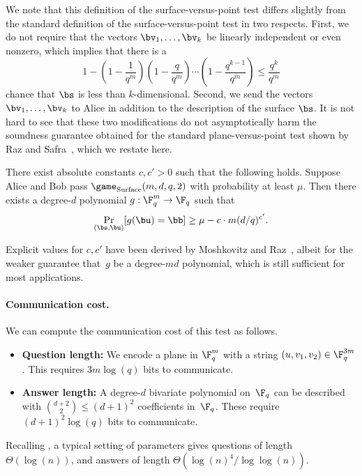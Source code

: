 We note that this definition of the surface-versus-point test differs slightly from the standard
definition of the surface-versus-point test in two respects. First, we
do not require that the vectors $\bv_1, \ldots, \bv_k$ be linearly independent
or even nonzero, which implies that there is a
\begin{equation*}
1-
\left(1 -\frac{1}{q^m}\right)
\left(1 -\frac{q}{q^m}\right)
\cdots
\left(1 -\frac{q^{k-1}}{q^m}\right)
\leq \frac{q^k}{q^m}
\end{equation*}
 chance that $\bs$
is less than $k$-dimensional. Second, we send the vectors $\bv_1,
\ldots, \bv_k$ to Alice in addition to the description of the surface $\bs$. It
is not hard to see that these two modifications do not asymptotically harm the
soundness guarantee obtained for the standard plane-versus-point test shown by Raz and
Safra~\cite{RS97}, which we restate here.

\begin{theorem}[\cite{RS97}]\label{thm:raz-safra}
There exist absolute constants $c, c' > 0$ such that the following holds.
Suppose Alice and Bob pass $\game_{\mathrm{Surface}}(m,d,q,2)$ with probability at least $\mu$.
Then there exists a degree-$d$ polynomial $g:\F_q^m \rightarrow \F_q$ such that
\begin{equation*}
\Pr_{(\bs, \bu)}[g(\bu) = \bb] \geq \mu - c\cdot m (d/q)^{c'}.
\end{equation*}
\end{theorem}

Explicit values for $c, c'$ have been derived by Moshkovitz and Raz~\cite{MR08},
albeit for the weaker guarantee that~$g$ be a degree-$m d$ polynomial,
which is still sufficient for most applications.

\paragraph{Communication cost.}
We can compute the communication cost of this test as follows.

\begin{itemize}
\itemsep -.5pt
\item[$\circ$] \textbf{Question length:} We encode a plane in $\F_q^m$ with a string $(u, v_1, v_2) \in \F_q^{3m}$. This requires $3 m \log(q)$ bits to communicate.
\item[$\circ$] \textbf{Answer length:} A degree-$d$ bivariate polynomial on~$\F_q$ can be described with $\binom{d+2}{2} \leq (d+1)^2$ coefficients in~$\F_q$. These require $(d+1)^2 \log(q)$ bits to communicate.
\end{itemize}
\noindent
Recalling , a typical setting of parameters
gives questions of length $\Theta(\log(n))$,
and  answers of length $\Theta(\log(n)^4/\log\log(n))$.

